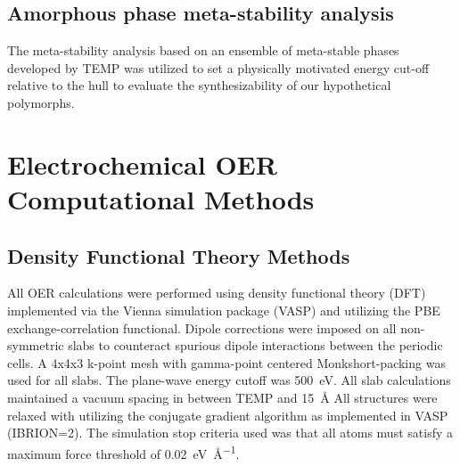 

\subsection{Amorphous phase meta-stability analysis} %
%

%
The meta-stability analysis based on an ensemble of meta-stable phases developed by TEMP was utilized to set a physically motivated energy cut-off relative to the hull to evaluate the synthesizability of our hypothetical polymorphs.




\section{Electrochemical OER Computational Methods}  %
%

\subsection{Density Functional Theory Methods}  %
%
%
All OER calculations were performed using density functional theory (DFT) implemented via the Vienna  simulation package (VASP)
\cite{Kresse1995,Kresse1996_0,Kresse1996_1}
and utilizing the PBE exchange-correlation functional\cite{Perdew1996}.
%
Dipole corrections were imposed on all non-symmetric slabs to counteract spurious dipole interactions between the periodic cells.\cite{Neugebauer1992}
%
A 4x4x3 k-point mesh with gamma-point centered Monkshort-packing\cite{Monkhorst1976} was used for all slabs.
%
The plane-wave energy cutoff was \SI{500}{\electronvolt}.
%
All slab calculations maintained a vacuum spacing in between TEMP and \SI{15}{\angstrom}
%
All structures were relaxed with utilizing the conjugate gradient algorithm as implemented in VASP (IBRION\num{=2}).
%
The simulation stop criteria used was that all atoms must satisfy a maximum force threshold of \SI{0.02}{\electronvolt\per\angstrom}.


